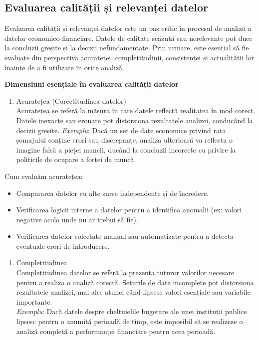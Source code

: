 \documentclass[
  11pt,
  b5paper,
  nottoc]{book}
\providecommand{\tightlist}{%
  \setlength{\itemsep}{0pt}\setlength{\parskip}{0pt}}\usepackage{longtable,booktabs,array}
\begin{document}
\hypertarget{evaluarea-calitux103ux21bii-ux219i-relevanux21bei-datelor}{%
\subsection{Evaluarea calității și relevanței
datelor}\label{evaluarea-calitux103ux21bii-ux219i-relevanux21bei-datelor}}

Evaluarea calității și relevanței datelor este un pas critic în procesul
de analiză a datelor economico-financiare. Datele de calitate scăzută
sau nerelevante pot duce la concluzii greșite și la decizii
nefundamentate. Prin urmare, este esențial să fie evaluate din
perspectiva acurateței, completitudinii, consistenței și actualității
lor înainte de a fi utilizate în orice analiză.

\textbf{Dimensiuni esențiale în evaluarea calității datelor}

\begin{enumerate}
\def\labelenumi{\arabic{enumi}.}
\tightlist
\item
  Acuratețea (Corectitudinea datelor)\\
  Acuratețea se referă la măsura în care datele reflectă realitatea în
  mod corect. Datele inexacte sau eronate pot distorsiona rezultatele
  analizei, conducând la decizii greșite. \emph{Exemplu}: Dacă un set de
  date economice privind rata șomajului conține erori sau discrepanțe,
  analiza ulterioară va reflecta o imagine falsă a pieței muncii, ducând
  la concluzii incorecte cu privire la politicile de ocupare a forței de
  muncă.
\end{enumerate}

Cum evaluăm acuratețea:

\begin{itemize}
\tightlist
\item
  Compararea datelor cu alte surse independente și de încredere.\\
\item
  Verificarea logicii interne a datelor pentru a identifica anomalii
  (ex: valori negative acolo unde nu ar trebui să fie).\\
\item
  Verificarea datelor colectate manual sau automatizate pentru a detecta
  eventuale erori de introducere.
\end{itemize}

\begin{enumerate}
\def\labelenumi{\arabic{enumi}.}
\setcounter{enumi}{1}
\tightlist
\item
  Completitudinea\\
  Completitudinea datelor se referă la prezența tuturor valorilor
  necesare pentru a realiza o analiză corectă. Seturile de date
  incomplete pot distorsiona rezultatele analizei, mai ales atunci când
  lipsesc valori esențiale sau variabile importante.\\
  \emph{Exemplu}: Dacă datele despre cheltuielile bugetare ale unei
  instituții publice lipsesc pentru o anumită perioadă de timp, este
  imposibil să se realizeze o analiză completă a performanței financiare
  pentru acea perioadă.
\end{enumerate}
\end{document}
